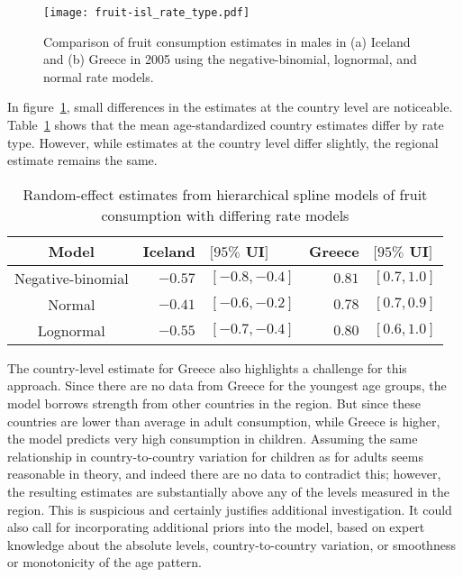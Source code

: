     \begin{figure}[h]
        \begin{center}
            \texttt{[image: fruit-isl\_rate\_type.pdf]}
            \caption[Comparison of fruit consumption estimates using different
              rate models in Iceland and Greece.]{Comparison of fruit
              consumption estimates in males in
              (a) Iceland and (b) Greece in 2005 using the
              negative-binomial, lognormal, and normal rate models.}
            \label{fig:app-fruit countries}
        \end{center}
    \end{figure}

In figure~\ref{fig:app-fruit countries},
small differences in the estimates at the country level are noticeable.
Table~\ref{tab:app-fruit rfx} shows that the mean age-standardized
country estimates differ by rate type.  However, while estimates at
the country level differ slightly, the regional estimate remains the same.

    \begin{table}[h]
        \caption{ Random-effect estimates from hierarchical spline 
          models of fruit consumption with differing
          rate models}
        \label{tab:app-fruit rfx}
        \begin{center}
        \begin{tabular}{|c|rl|rl|}
            \hline
                Model & Iceland&$[95\%$ UI$]$ & Greece&$[95\%$ UI$]$ \\
            \hline
                Negative-binomial & $-0.57$&$ [-0.8, -0.4]$ & $0.81$&$ [0.7, 1.0]$ \\
                Normal & $-0.41$&$ [-0.6, -0.2]$ & $0.78$&$ [0.7, 0.9]$ \\
                Lognormal & $-0.55$& $[-0.7, -0.4]$ & $0.80$&$ [0.6, 1.0]$ \\
            \hline
        \end{tabular}
        \end{center}
    \end{table}

The country-level estimate for Greece also highlights a challenge for
this approach.  Since there are no data from Greece for the youngest
age groups, the model borrows strength from other countries in the
region.  But since these countries are lower than average in adult
consumption, while Greece is higher, the model predicts very high
consumption in children.  Assuming the same relationship in
country-to-country variation for children as for adults seems reasonable
in theory, and indeed there are no data to contradict this; however,
the resulting estimates are substantially above any of the levels
measured in the region.  This is suspicious and certainly justifies
additional investigation.  It could also call for incorporating
additional priors into the model, based on expert knowledge about the
absolute levels, country-to-country variation, or smoothness or
monotonicity of the age pattern.

